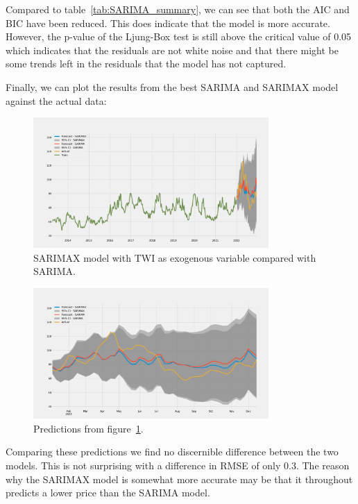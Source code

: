 Compared to table~\ref{tab:SARIMA_summary}, we can see that both the AIC and BIC have been reduced. This does indicate that the model is more accurate. However, the p-value of the Ljung-Box test is still above the critical value of 0.05 which indicates that the residuals are not white noise and that there might be some trends left in the residuals that the model has not captured.

Finally, we can plot the results from the best SARIMA and SARIMAX model against the actual data:
\begin{figure}[H]
    \centering
    \includegraphics[width=0.8\textwidth]{data/Figures/ARIMA/SARIMA-SARIMAX.png}
    \caption[SARIMAX(2,1,0)(0,1,0,52)(TWI) compared with SARIMA.]{SARIMAX model with TWI as exogenous variable compared with SARIMA.}\label{fig:SARIMA-SARIMAX}
\end{figure}
\begin{figure}[H]
    \centering
    \includegraphics[width=0.8\textwidth]{data/Figures/ARIMA/SARIMA-SARIMAX_no_train.png}
    \caption{Predictions from figure~\ref{fig:SARIMA-SARIMAX}.}\label{fig:SARIMA-SARIMAX_no_train}
\end{figure}
Comparing these predictions we find no discernible difference between the two models. This is not surprising with a difference in RMSE of only 0.3. The reason why the SARIMAX model is somewhat more accurate may be that it throughout predicts a lower price than the SARIMA model.

